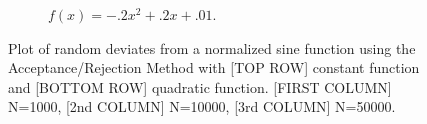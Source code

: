 \begin{figure}
\begin{subfigure}[b]{0.3\textwidth}
    \caption{$f(x)=-.2x^2+.2x+.01$.}
    \label{subfig:QuadN50000}
  \end{subfigure}
  \caption{Plot of random deviates from a normalized sine function using the Acceptance/Rejection Method with [TOP ROW] constant function and [BOTTOM ROW] quadratic function. [FIRST COLUMN] N=1000, [2nd COLUMN] N=10000, [3rd COLUMN] N=50000.}
  \label{fig:accRejPlot}
\end{figure}


